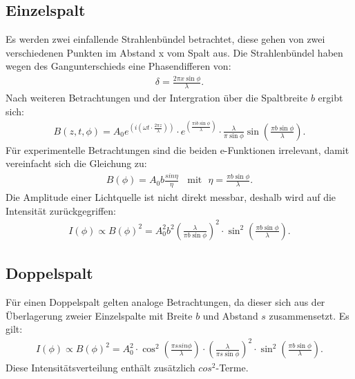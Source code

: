 \subsection{Einzelspalt}
Es werden zwei einfallende Strahlenbündel betrachtet, diese gehen von zwei verschiedenen Punkten im Abstand x vom
Spalt aus. Die Strahlenbündel haben wegen des Gangunterschieds eine Phasendifferen von:
\begin{align}
\delta = \frac{2\pi x \sin\phi}{\lambda}.
\end{align}
Nach weiteren Betrachtungen und der Intergration über die Spaltbreite $b$ ergibt sich:
\begin{align}
B(z,t,\phi)=A_0 e^{\left(i\left(\omega t\cdot\frac{2\pi z}{\lambda}\right)\right)}\cdot e^{\left(\frac{\pi i b\sin\phi}{\lambda}\right)}\cdot\frac{\lambda}{\pi\sin\phi}\sin\left(\frac{\pi b \sin\phi}{\lambda}\right).
\end{align}
Für experimentelle Betrachtungen sind die beiden e-Funktionen irrelevant, damit vereinfacht sich die Gleichung zu:
\begin{align}
B(\phi)=A_0 b \frac{sin \eta}{\eta} \ \ \ \ \text{mit} \ \ \ \eta=\frac{\pi b \sin \phi}{\lambda}.
\end{align}
Die Amplitude einer Lichtquelle ist nicht direkt messbar, deshalb wird auf die Intensität zurückgegriffen:
\begin{align}
I(\phi)\propto B(\phi)^2 = A_0^2 b^2\left(\frac{\lambda}{\pi b \sin\phi}\right)^2\cdot\sin^2\left(\frac{\pi b \sin\phi}{\lambda}\right).\label{eqn:einzel}
\end{align}
\subsection{Doppelspalt}
Für einen Doppelspalt gelten analoge Betrachtungen, da dieser sich aus der Überlagerung zweier Einzelspalte
mit Breite $b$ und Abstand $s$ zusammensetzt. Es gilt:
\begin{align}
I(\phi) \propto B(\phi)^2 = A_0^2\cdot\cos^2\left(\frac{\pi s sin\phi}{\lambda}\right)\cdot\left(\frac{\lambda}{\pi s \sin\phi}\right)^2\cdot\sin^2\left(\frac{\pi b \sin\phi}{\lambda}\right).\label{eqn:dopp}
\end{align}
Diese Intensitätsverteilung enthält zusätzlich $cos^2$-Terme.
